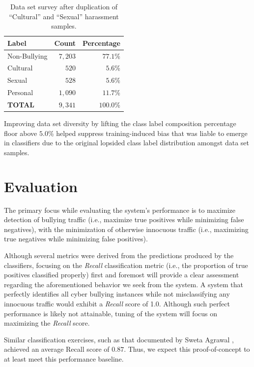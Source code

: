 \documentclass[conference]{sig-alternate-05-2015}
\begin{document}
\begin{table}[ht!]
  \centering
  \begin{tabular}{| l | r | r |}
    \hline
    Label & Count & Percentage \\
    \hline\hline
    Non-Bullying & $7,203$ & $77.1$\% \\
    \hline
    Cultural & $520$ & $5.6$\% \\
    \hline
    Sexual & $528$ & $5.6$\% \\
    \hline
    Personal & $1,090$ & $11.7$\% \\
    \hline\hline
    \textbf{TOTAL} & $9,341$ & $100.0$\% \\
    \hline
  \end{tabular}
  \caption{Data set survey after duplication of ``Cultural'' and ``Sexual''
  harassment samples.}
  \label{tab:dataset_survey_final}
\end{table}

Improving data set diversity by lifting the class label composition percentage
floor above $5.0$\% helped suppress training-induced bias that was liable to
emerge in classifiers due to the original lopsided class label distribution
amongst data set samples.

\section{Evaluation}\label{sec:evaluation}

The primary focus while evaluating the system's performance is to maximize
detection of bullying traffic (i.e., maximize true positives while minimizing
false negatives), with the minimization of otherwise innocuous traffic (i.e.,
maximizing true negatives while minimizing false positives).

Although several metrics were derived from the predictions produced by the
classifiers, focusing on the \textit{Recall} classification metric
(i.e., the proportion of true positives classified properly) first and foremost
will provide a clear assessment regarding the aforementioned behavior we seek
from the system. A system that perfectly identifies all cyber bullying instances
while not misclassifying any innocuous traffic would exhibit a \textit{Recall}
score of 1.0. Although such perfect performance is likely not attainable, tuning
of the system will focus on maximizing the \textit{Recall} score.

Similar classification exercises, such as that documented by Sweta Agrawal
\cite{agrawal2018deep}, achieved an average Recall score of \( 0.87 \). Thus,
we expect this proof-of-concept to at least meet this performance baseline.
\end{document}
